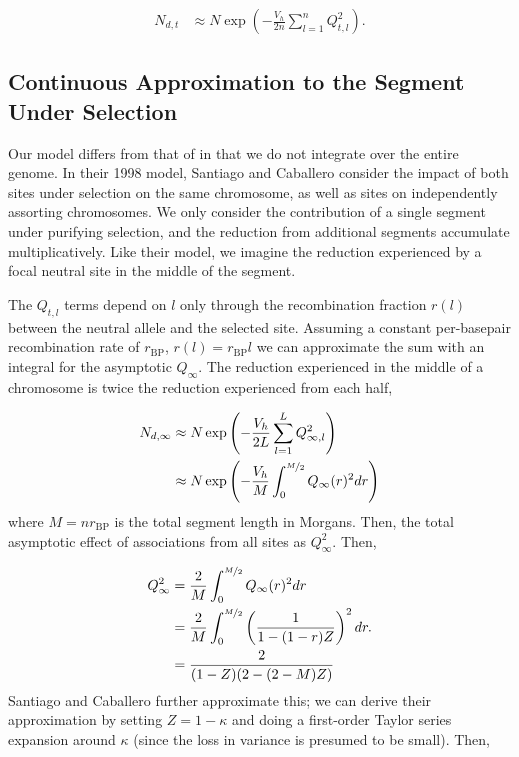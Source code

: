 \documentclass[11pt]{article}
\begin{document}
\begin{align}
      N_{d,t} &\approx N \exp\left(- \frac{V_{h}}{2n} \sum_{l=1}^n Q_{t,l}^2\right).
\end{align}

\subsection{Continuous Approximation to the Segment Under Selection}

Our model differs from that of \textcite{Santiago1998-bs} in that we do not
integrate over the entire genome. In their 1998 model, Santiago and Caballero
consider the impact of both sites under selection on the same chromosome, as
well as sites on independently assorting chromosomes. We only consider the
contribution of a single segment under purifying selection, and the reduction
from additional segments accumulate multiplicatively. Like their model, we
imagine the reduction experienced by a focal neutral site in the middle of the
segment. 

The $Q_{t,l}$ terms depend on $l$ only through the recombination fraction
$r(l)$ between the neutral allele and the selected site. Assuming a constant
per-basepair recombination rate of $r_\text{BP}$, $r(l) = r_\text{BP} l$ we can
approximate the sum with an integral for the asymptotic $Q_\infty$. The
reduction experienced in the middle of a chromosome is twice the reduction
experienced from each half, 

\begin{align}
      N_{d,\infty} &\approx N \exp\left(- \frac{V_{h}}{2L} \sum_{l=1}^L Q_{\infty,l}^2\right) \nonumber \\
              &\approx N \exp\left(- \frac{V_{h}}{M} \int_0^{\nicefrac{M}{2}} Q_{\infty}(r)^2 dr \right) 
\end{align}
%
where $M = n r_\text{BP}$ is the total segment length in Morgans. Then, the
total asymptotic effect of associations from all sites as $Q_\infty^2$.  Then,

\begin{align}
  Q_\infty^2 &= \frac{2}{M}\int_0^{\nicefrac{M}{2}} Q_{\infty}(r)^2 dr  \nonumber \\
  &=  \frac{2}{M} \int_0^{\nicefrac{M}{2}} \left(\frac{1}{1 - (1-r)Z}\right)^2 dr. \nonumber  \\
  &= \frac{2}{(1-Z) (2-(2-M) Z)}
\end{align}
%
Santiago and Caballero further approximate this; we can derive their
approximation by setting $Z = 1-\kappa$ and doing a first-order Taylor series
expansion around $\kappa$ (since the loss in variance is presumed to be small).
Then,
\end{document}
